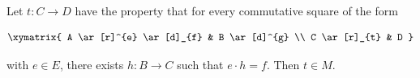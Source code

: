 Let $t: C \longrightarrow D$ have the property that for every commutative square of the form

$$\xymatrix{
A \ar[r]^{e} \ar[d]_{f} & B \ar[d]^{g} \\
C \ar[r]_{t} & D
}$$

with $e \in E$, there exists $h: B \longrightarrow C$ such that $e \cdot h = f$. Then $t \in M$.
